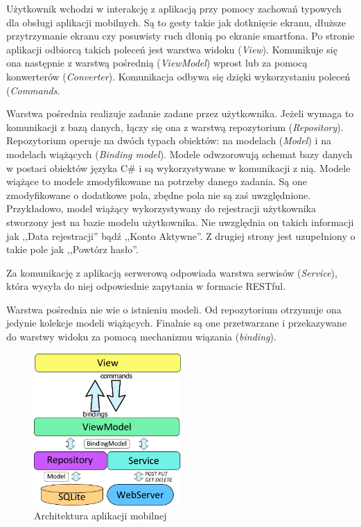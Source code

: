 \documentclass[a4paper]{book}
\begin{document}
			Użytkownik wchodzi w interakcję z aplikacją przy pomocy zachowań typowych dla obsługi aplikacji mobilnych. Są to gesty takie jak dotknięcie ekranu, dłuższe przytrzymanie ekranu czy posuwisty ruch dłonią po ekranie smartfona. 
			Po stronie aplikacji odbiorcą takich poleceń jest warstwa widoku (\emph{View}). Komunikuje się ona następnie z warstwą pośrednią (\emph{ViewModel}) wprost lub za pomocą konwerterów (\emph{Converter}). Komunikacja odbywa się dzięki wykorzystaniu poleceń (\emph{Commands}. 
			
			Warstwa pośrednia realizuje zadanie zadane przez użytkownika. Jeżeli wymaga to komunikacji z bazą danych, łączy się ona z warstwą repozytorium (\emph{Repository}). Repozytorium operuje na dwóch typach obiektów: na modelach (\emph{Model}) i na modelach wiążących (\emph{Binding model}). Modele odwzorowują schemat bazy danych w postaci obiektów języka C\# i są wykorzystywane w komunikacji z nią. Modele wiążące to modele zmodyfikowane na potrzeby danego zadania.  %
			Są one zmodyfikowane o dodatkowe pola, zbędne pola nie są zaś uwzględnione. Przykładowo, model wiążący wykorzystywany do rejestracji użytkownika stworzony jest na bazie modelu użytkownika. Nie uwzględnia on takich informacji jak ,,Data rejestracji'' bądź ,,Konto Aktywne''. Z drugiej strony jest uzupełniony o takie pole jak ,,Powtórz hasło''.
			
			Za komunikację z aplikacją serwerową odpowiada warstwa serwisów (\emph{Service}), która wysyła do niej odpowiednie zapytania w formacie RESTful. 
			
			Warstwa pośrednia nie wie o istnieniu modeli. Od repozytorium otrzymuje ona jedynie kolekcje modeli wiążących. Finalnie są one przetwarzane i przekazywane do warstwy widoku za pomocą mechanizmu wiązania (\emph{binding}).
			\begin{figure}
				\centering
				\includegraphics[width=0.5\textwidth]{images/architektura_mobile.pdf}
				\caption{Architektura aplikacji mobilnej}
				\label{fig:architektura_mobile}
			\end{figure}
			
\end{document}
